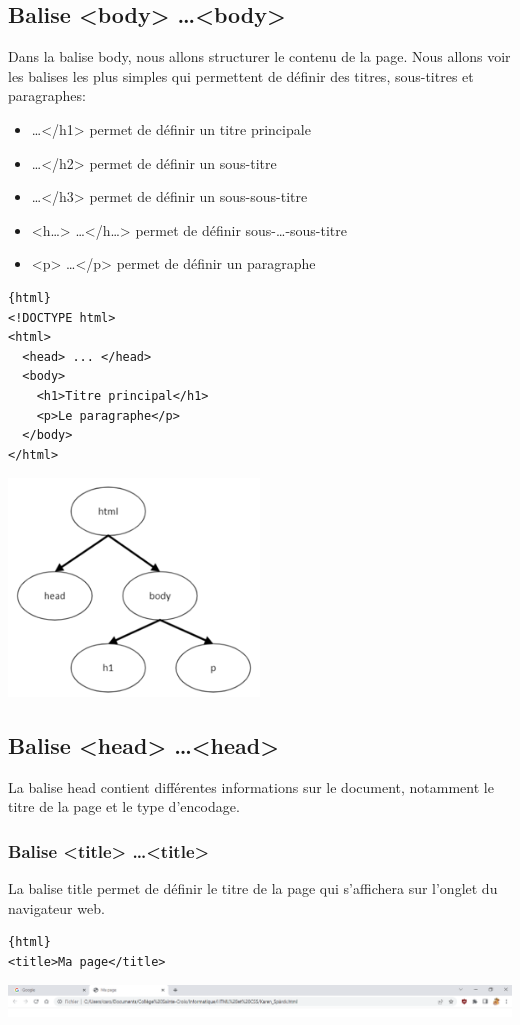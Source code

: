 \documentclass[a4paper,11pt]{article}
\begin{document}
\subsection{Balise <body> \dots <body>}
Dans la balise body, nous allons structurer le contenu de la page. Nous allons voir les balises les plus simples qui permettent de définir des titres, sous-titres et paragraphes:
\begin{itemize}
\item <h1> \dots </h1>  permet de définir un titre principale
\item <h2> \dots </h2>  permet de définir un sous-titre
\item <h3> \dots </h3>  permet de définir un sous-sous-titre
\item <h\dots> \dots </h\dots>  permet de définir  sous-\dots-sous-titre
\item  <p> \dots </p>  permet de définir un paragraphe
\end{itemize}
\begin{multicols}{2}
\begin{verbatim}{html}
<!DOCTYPE html>
<html>
  <head> ... </head>
  <body>
    <h1>Titre principal</h1>
    <p>Le paragraphe</p>
  </body>
</html>
\end{verbatim}
\includegraphics[width=0.5\textwidth]{images/balise-body.png} \\
\end{multicols}

\subsection{Balise <head> \dots <head>}
La balise head contient différentes informations sur le document, notamment le titre de la page et le type d'encodage.

\subsubsection{Balise <title> \dots <title>}
La balise title permet de définir le titre de la page qui s'affichera sur l'onglet du navigateur web.
\begin{verbatim}{html}
<title>Ma page</title>
\end{verbatim}
\includegraphics[width=1.0\textwidth]{images/barre-titre.png}
\end{document}
